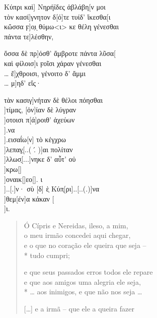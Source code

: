\begin{gkverse}
Κύπρι καὶ] Νηρήϊδες ἀβλάβη[ν μοι\\
		τὸν κασί]γνητον δ[ό]τε τυίδ’ ἴκεσθα[ι\\
κὤσσα ϝ]ο̣ι ̣θύμω<ι> κε θέλη γένεσθαι\\
πάντα τε]λέσθην,

ὄσσα δὲ πρ]όσθ’ ἄμβροτε πάντα λῦσα[\\
καὶ φίλοισ]ι ϝοῖσι χάραν γένεσθαι\\
\ldots{} ἔ]χθροισι, γένοιτο δ’ ἄμμι\\
\ldots{} μ]ηδ’ εἴς·

τὰν κασιγ]νήταν δὲ θέλοι πόησθαι\\
 ]τίμας, [ὀν]ίαν δὲ λύγραν\\
 ]οτοισι π[ά]ροιθ’ ἀχεύων\\
 ].να\\
 ].εισαΐω[ν] τὸ κέγχρω\\
  ]λεπαγ̣[..( .́ )]αι πολίταν\\
  ]λλωσ̣[...]νηκε δ’ αὖτ’ οὐ\\
 ]κρω[]\\
 ]οναικ[\quad]εο[\quad]. ι\\
 ]..[.]ν· σὺ [δ] ὲ̣ Κύπ̣[ρι]..[..(.)]να\\
       ]θεμ[έν]α κάκαν [\\
	       ]ι.	
\end{gkverse}

\begin{verse}
Ó Cípris e Nereidas, ileso, a mim,\\
o meu irmão concedei aqui chegar,\\
e o que no coração ele queira que seja --\\*
tudo cumpri;

e que seus passados erros todos ele repare\\
e que aos amigos uma alegria ele seja,\\*
\ldots{} aos inimigos, e que não nos seja \ldots{}

[\ldots{}] e a irmã -- que ele a queira fazer
\end{verse}

